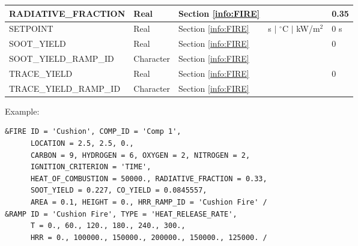 \begin{minipage}{6.5in}
\begin{longtable}{@{\extracolsep{\fill}}|l|l|l|l|l|}
{\ct RADIATIVE\_FRACTION}  & Real        & Section \ref{info:FIRE}                 &                             &     0.35        \\ \hline
{\ct SETPOINT}             & Real        & Section \ref{info:FIRE}                 & s $\mid$ $^\circ$C $\mid$ kW/m$^2$  & 0 s        \\ \hline
{\ct SOOT\_YIELD}          & Real        & Section \ref{info:FIRE}                 &                             & 0                \\ \hline
{\ct SOOT\_YIELD\_RAMP\_ID}            & Character        & Section \ref{info:FIRE}                 &                             &                 \\ \hline
{\ct TRACE\_YIELD}         & Real        & Section \ref{info:FIRE}                 &                             &  0               \\ \hline
{\ct TRACE\_YIELD\_RAMP\_ID}            & Character        & Section \ref{info:FIRE}                 &                             &                 \\ \hline
\end{longtable}
\end{minipage}


\vspace{\baselineskip}
\noindent Example:
\begin{lstlisting}
&FIRE ID = 'Cushion', COMP_ID = 'Comp 1',
      LOCATION = 2.5, 2.5, 0.,
      CARBON = 9, HYDROGEN = 6, OXYGEN = 2, NITROGEN = 2,
      IGNITION_CRITERION = 'TIME',
      HEAT_OF_COMBUSTION = 50000., RADIATIVE_FRACTION = 0.33,
      SOOT_YIELD = 0.227, CO_YIELD = 0.0845557,
      AREA = 0.1, HEIGHT = 0., HRR_RAMP_ID = 'Cushion Fire' /
&RAMP ID = 'Cushion Fire', TYPE = 'HEAT_RELEASE_RATE',
      T = 0., 60., 120., 180., 240., 300.,
      HRR = 0., 100000., 150000., 200000., 150000., 125000. /
\end{lstlisting}




